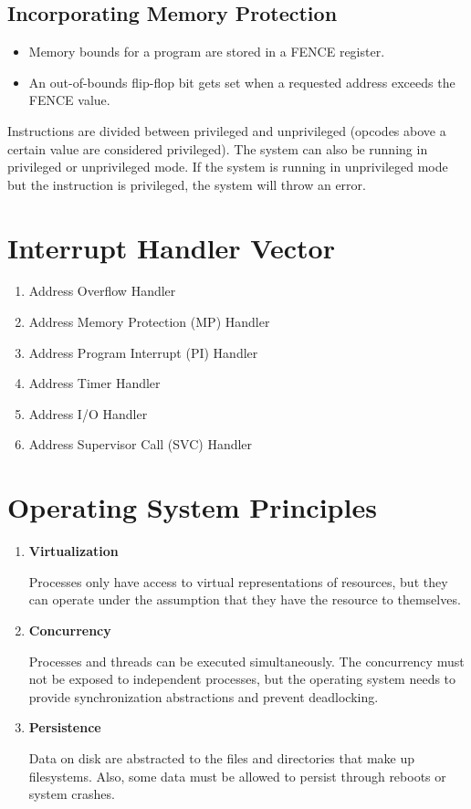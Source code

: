 \documentclass{article}
\begin{document}
\subsection*{Incorporating Memory Protection}

\begin{itemize}
    \item Memory bounds for a program are stored in a FENCE register.
    \item An out-of-bounds flip-flop bit gets set when a requested address exceeds the FENCE value.
\end{itemize}

Instructions are divided between privileged and unprivileged (opcodes above a certain value are considered privileged). The system can also be running in privileged or unprivileged mode. If the system is running in unprivileged mode but the instruction is privileged, the system will throw an error.

\section*{Interrupt Handler Vector}
\begin{enumerate}
    \item Address Overflow Handler
    \item Address Memory Protection (MP) Handler
    \item Address Program Interrupt (PI) Handler
    \item Address Timer Handler
    \item Address I/O Handler
    \item Address Supervisor Call (SVC) Handler
\end{enumerate}

\section*{Operating System Principles}

\begin{enumerate}
    \item \textbf{Virtualization}
    
    Processes only have access to virtual representations of resources, but they can operate under the assumption that they have the resource to themselves.

    \item \textbf{Concurrency}
    
    Processes and threads can be executed simultaneously. The concurrency must not be exposed to independent processes, but the operating system needs to provide synchronization abstractions and prevent deadlocking.

    \item \textbf{Persistence}
    
    Data on disk are abstracted to the files and directories that make up filesystems. Also, some data must be allowed to persist through reboots or system crashes.
\end{enumerate}
\end{document}
